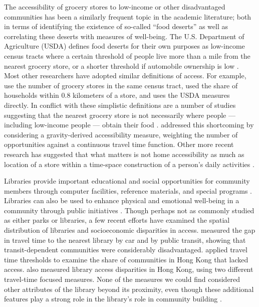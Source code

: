 \documentclass[ijerph,article,submit,moreauthors,pdftex]{mdpi}
\begin{document}
The accessibility of grocery stores to low-income or other disadvantaged
communities has been a similarly frequent topic in the academic literature;
both in terms of identifying the existence of so-called ``food deserts'' as well
as correlating these deserts with measures of well-being. The U.S. Department of
Agriculture (USDA) defines food deserts for their own purposes as low-income census tracts
where a certain threshold of people live more than a mile from the nearest
grocery store, or a shorter threshold if automobile ownership is low \citep{usdafara}.
Most other researchers have adopted similar definitions of access. For example,
\citet{morland2002} use the number of grocery stores in the same census tract, \citet{algert2006}
used the share of households within 0.8 kilometers of a store, and \citet{hamidi2020}
uses the USDA measures directly.
In conflict with these simplistic definitions are
a number of studies suggesting that the nearest grocery store is not necessarily
where people --- including low-income people --- obtain their food
\citep{recker1978, clifton2004, aggarwal2014}. \citet{wood2016} addressed this shortcoming
by considering a gravity-derived accessibility measure, weighting the number of
opportunities against a continuous travel time function. Other more recent research
has suggested that what matters
is not home accessibility as much as location of a store within a time-space construction
of a person's daily activities \citep{widener2015spatiotemporal, chen2021effects}.

Libraries provide important educational and social opportunities for community
members through computer facilities, reference materials, and special programs
\citep{maxwell2008libraries, barclay2017space}. Libraries can also be used to
enhance physical and emotional well-being in a community through public
initiatives \citep{philbin2019}. Though perhaps not as commonly studied as either
parks or libraries, a few recent efforts have examined the spatial distribution
of libraries and socioeconomic disparities in access. \citet{allen2019} measured the
gap in travel time to the nearest library by car and by public transit, showing
that transit-dependent communities were considerably disadvantaged. \citet{cheng2021}
applied travel time thresholds to examine the share of communities in Hong Kong
that lacked access. \citet{guo2017} also measured library access disparities in Hong Kong,
using two different travel-time focused measures. None of the measures we could
find considered other attributes of the library beyond its proximity, even though
these additional features play a strong role in the library's role in community building
\citep{barclay2017space}.
\end{document}
